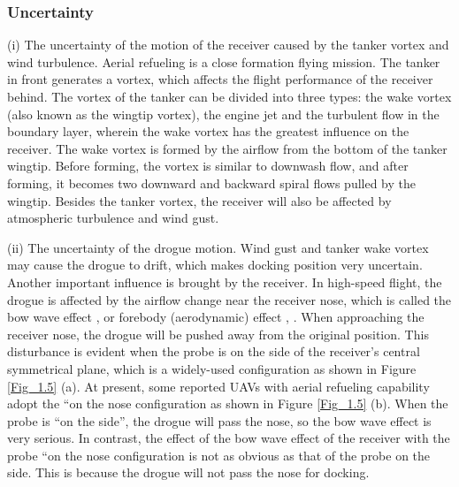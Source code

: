 \subsubsection{Uncertainty }

(i) The uncertainty of the motion of the receiver caused by the tanker
vortex and wind turbulence. Aerial refueling is a close formation
flying mission. The tanker in front generates a vortex, which affects
the flight performance of the receiver behind. The vortex of the tanker
can be divided into three types: the wake vortex (also known as the
wingtip vortex), the engine jet and the turbulent flow in the boundary
layer, wherein the wake vortex has the greatest influence on the receiver.
The wake vortex is formed by the airflow from the bottom of the tanker
wingtip. Before forming, the vortex is similar to downwash flow, and
after forming, it becomes two downward and backward spiral flows pulled
by the wingtip. Besides the tanker vortex, the receiver will also
be affected by atmospheric turbulence and wind gust. 

(ii) The uncertainty of the drogue motion. Wind gust and tanker wake
vortex may cause the drogue to drift, which makes docking position
very uncertain. Another important influence is brought by the receiver.
In high-speed flight, the drogue is affected by the airflow change
near the receiver nose, which is called the bow wave effect \cite{Dogan-2013-7},
\cite{bhandari2013bow} or forebody (aerodynamic) effect \cite{Dibley-2007-2},
\cite{ro2011dynamics}. When approaching the receiver nose, the drogue
will be pushed away from the original position. This disturbance is
evident when the probe is on the side of the receiver\textquoteright s
central symmetrical plane, which is a widely-used configuration as
shown in Figure \ref{Fig_1.5} (a). At present, some reported UAVs
with aerial refueling capability adopt the \textquotedblleft on the
nose\textquotedbl{} configuration as shown in Figure \ref{Fig_1.5}
(b). When the probe is \textquotedblleft on the side\textquotedblright ,
the drogue will pass the nose, so the bow wave effect is very serious.
In contrast, the effect of the bow wave effect of the receiver with
the probe \textquotedblleft on the nose\textquotedbl{} configuration
is not as obvious as that of the probe on the side. This is because
the drogue will not pass the nose for docking. 

